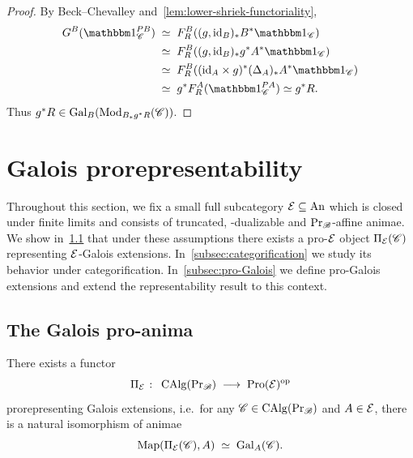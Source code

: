 \documentclass[english,svgnames,table]{article}
\begin{document}
\begin{proof}
        By Beck--Chevalley and~\cref{lem:lower-shriek-functoriality},
        \begin{equation*}
            \begin{split}
                G^B(\ounit_{\cC}^{\Path B})
                & \;\simeq\; F_R^B((g, \id_B)_* B^* \ounit_{\cC}) \\
                & \;\simeq\; F_R^B((g, \id_B)_* g^* A^* \ounit_{\cC}) \\
                & \;\simeq\; F_R^B((\id_A \times g)^* (\Delta_A)_* A^* \ounit_{\cC}) \\
                & \;\simeq\; g^* F_R^A(\ounit_{\cC}^{\Path A}) \simeq g^* R.
            \end{split}
        \end{equation*}
        Thus $g^* R \in \mathrm{Gal}_B(\operatorname{Mod}_{B_* g^* R}(\mathscr{C}))$.
    \end{proof}

\section{Galois prorepresentability}
\label{sec:Galois-anima}
Throughout this section, we fix a small full subcategory $\mathcal{E}\subseteq \mathrm{An}$ which is closed under finite limits and consists of truncated, \COB-dualizable and $\operatorname{Pr}_{\mathscr{B}}$-affine animae.
We show in~\cref{subsec:prorepresentability} that under these assumptions there exists a pro-$\mathcal{E}$ object $\Pi_{\mathcal{E}}(\mathscr{C})$ representing $\mathcal{E}$-Galois extensions. 
In~\cref{subsec:categorification} we study its behavior under categorification. 
In~\cref{subsec:pro-Galois} we define pro-Galois extensions and extend the representability result to this context.

\subsection{The Galois pro-anima}
\label{subsec:prorepresentability}
 
    \begin{theorem}
    \label{thm:pro-affine-anima}
        There exists a functor
        \begin{equation*}
            \Pi_{\mathcal{E}} \;\colon\; \operatorname{CAlg}(\operatorname{Pr}_{\mathscr{B}}) \;\longrightarrow\; \operatorname{Pro}(\mathcal{E})^{\mathrm{op}}
        \end{equation*}
        prorepresenting Galois extensions, i.e.\ for any $\mathscr{C} \in \operatorname{CAlg}(\operatorname{Pr}_{\mathscr{B}})$ and $A \in \mathcal{E}$, there is a natural isomorphism of animae
        \begin{equation*}
            \operatorname{Map}(\Pi_{\mathcal{E}}(\mathscr{C}), A) \;\simeq\; \mathrm{Gal}_A(\mathscr{C}).
        \end{equation*}
    \end{theorem}
    
\end{document}
